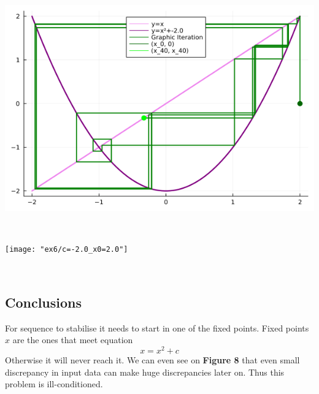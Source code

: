 \documentclass[11pt]{article}
\begin{document}
\begin{minipage}{0.49\linewidth}
    \includegraphics[scale=0.7]{"ex6/c=-2.0_x0=1.99999999999999"} 
\end{minipage}\\
\begin{minipage}{0.49\linewidth}
    \texttt{[image: "ex6/c=-2.0\_x0=2.0"]} 
\end{minipage}\\
\subsection{Conclusions}
For sequence to stabilise it needs to start in one of the fixed points. Fixed points $x$ are the ones that meet equation
$$x = x^2 + c$$
Otherwise it will never reach it.
We can even see on \textbf{Figure 8} that even small discrepancy in input data can make huge discrepancies later on.
Thus this problem is ill-conditioned.
\end{document}
